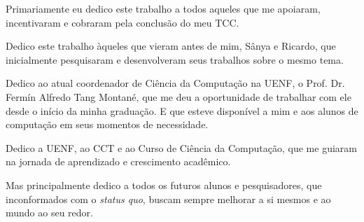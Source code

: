 \begin{dedicatoria}
  \vspace*{\fill}
  \centering
  \noindent

  Primariamente eu dedico este trabalho a todos aqueles que me apoiaram, incentivaram e cobraram pela conclusão do meu TCC.

  Dedico este trabalho àqueles que vieram antes de mim, Sânya e Ricardo, que inicialmente pesquisaram e desenvolveram seus trabalhos sobre o mesmo tema.

  Dedico ao atual coordenador de Ciência da Computação na UENF, o Prof. Dr. Fermín Alfredo Tang Montané, que me deu a oportunidade de trabalhar com ele desde o início da minha graduação. E que esteve disponível a mim e aos alunos de computação em seus momentos de necessidade.

  Dedico a UENF, ao CCT e ao Curso de Ciência da Computação, que me guiaram na jornada de aprendizado e crescimento acadêmico.

  Mas principalmente dedico a todos os futuros alunos e pesquisadores, que inconformados com o \textit{status quo}, buscam sempre melhorar a si mesmos e ao mundo ao seu redor.

  \vspace*{\fill}
\end{dedicatoria}